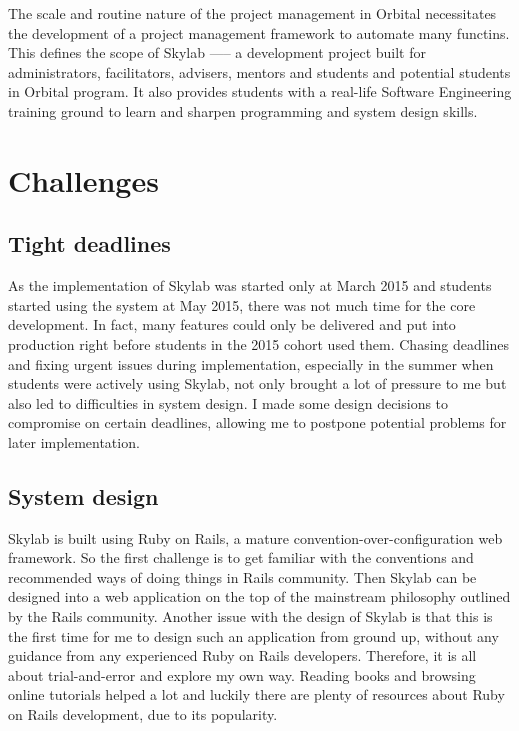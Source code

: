 The scale and routine nature of the project management in Orbital necessitates the development of a project management framework to automate many functins.  This defines the scope of Skylab —-- a development project built for administrators, facilitators, advisers, mentors and students and potential students in Orbital program. It also provides students with a real-life Software Engineering training ground to learn and sharpen programming and system design skills.

\section{Challenges}

\subsection{Tight deadlines}

As the implementation of Skylab was started only at March 2015 and students started using the system at May 2015, there was not much time for the core development. In fact, many features could only be delivered and put into production right before students in the 2015 cohort used them. Chasing deadlines and fixing urgent issues during implementation, especially in the summer when students were actively using Skylab, not only brought a lot of pressure to me but also led to difficulties in system design. I made some design decisions to compromise on certain deadlines, allowing me to postpone potential problems for later implementation.

\subsection{System design}

Skylab is built using Ruby on Rails, a mature convention-over-configuration web framework. So the first challenge is to get familiar with the conventions and recommended ways of doing things in Rails community. Then Skylab can be designed into a web application on the top of the mainstream philosophy outlined by the Rails community. Another issue with the design of Skylab is that this is the first time for me to design such an application from ground up, without any guidance from any experienced Ruby on Rails developers. Therefore, it is all about trial-and-error and explore my own way. Reading books and browsing online tutorials helped a lot and luckily there are plenty of resources about Ruby on Rails development, due to its popularity.

